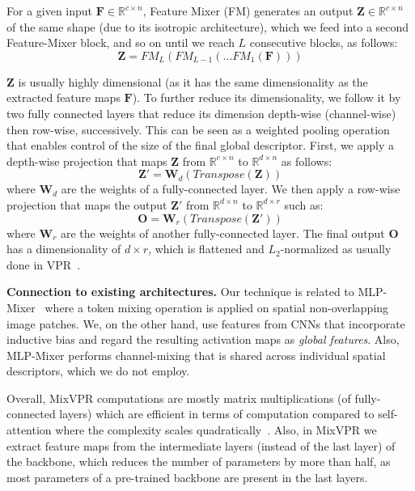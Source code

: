 \documentclass[10pt,twocolumn,letterpaper]{article}
\begin{document}
For a given input $\mathbf{F} \in \mathbb{R}^{c \times n}$, Feature Mixer (FM) generates an output $\mathbf{Z} \in \mathbb{R}^{c \times n}$ of the same shape (due to its isotropic architecture), which we feed into a second Feature-Mixer block, and so on until we reach $L$ consecutive blocks, as follows:
\begin{equation}
    \mathbf{Z} = FM_L(FM_{L-1}(\dots FM_1(\mathbf{F})))
\end{equation}

$\mathbf{Z}$ is usually highly dimensional (as it has the same dimensionality as the extracted feature maps $\mathbf{F}$). To further reduce its dimensionality, we follow it by two fully connected layers that reduce its dimension depth-wise (channel-wise) then row-wise,  successively. This can be seen as a weighted pooling operation that enables control of the size of the final global descriptor.
First, we apply a depth-wise projection that maps $\mathbf{Z}$ from $\mathbb{R}^{c \times n}$ to $\mathbb{R}^{d \times n}$ as follows:
\begin{equation}
    \mathbf{Z'} = \mathbf{W}_d(Transpose(\mathbf{Z}))
\end{equation}
where $\mathbf{W}_d$ are the weights of a fully-connected layer.
We then apply a row-wise projection that maps the output $\mathbf{Z'}$ from $\mathbb{R}^{d \times n}$ to $\mathbb{R}^{d \times r}$ such as: 
\begin{equation}
    \mathbf{O} = \mathbf{W}_r(Transpose(\mathbf{Z'}))
\end{equation}
where $\mathbf{W}_r$ are the weights of another fully-connected layer. The final output $\mathbf{O}$ has a dimensionality of $d {\times} r$, which is flattened and $L_2$-normalized as usually done in VPR~\cite{arandjelovic2016netvlad, ge2020self, berton2022rethinking}.

\vspace{5pt}
\noindent\textbf{Connection to existing architectures.} Our technique is related to MLP-Mixer~\cite{tolstikhin2021mlp} where a token mixing operation is applied on spatial non-overlapping image patches. We, on the other hand, use features from CNNs that incorporate inductive bias and regard the resulting activation maps as \textit{global features}. Also, MLP-Mixer performs channel-mixing that is shared across individual spatial descriptors, which we do not employ. 

Overall, MixVPR computations are mostly matrix multiplications (of fully-connected layers) which are efficient in terms of computation compared to self-attention where the complexity scales quadratically~\cite{tolstikhin2021mlp}. Also, in MixVPR we extract feature maps from the intermediate layers (instead of the last layer) of the backbone, which reduces the number of parameters by more than half, as most parameters of a pre-trained backbone are present in the last layers.
\end{document}
